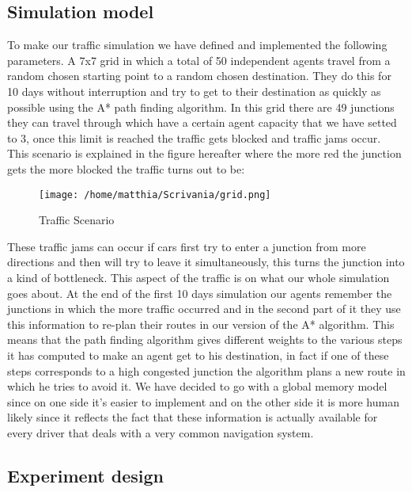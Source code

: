\documentclass[a4paper,hidelinks]{article}
\begin{document}
\subsection{Simulation model}
To make our traffic simulation we have defined and implemented the following parameters. A 7x7 grid in which a total of 50 independent agents travel from a random chosen starting point to a random chosen destination. They do this for 10 days without interruption and try to get to their destination as quickly as possible using the A* path finding algorithm. In this grid there are 49 junctions they can travel through which have a certain agent capacity that we have setted to 3, once this limit is reached the traffic gets blocked and traffic jams occur. This scenario is explained in the figure hereafter where the more red the junction gets the more blocked the traffic turns out to be:

\begin{figure}[ht!]
\centering
\texttt{[image: /home/matthia/Scrivania/grid.png]}
\caption{Traffic Scenario \label{overflow}}
\end{figure} 


These traffic jams can occur if cars first try to enter a junction from more directions and then will try to leave it simultaneously, this turns the junction into a kind of bottleneck. This aspect of the traffic is on what our whole simulation goes about. At the end of the first 10 days simulation our agents remember the junctions in which the more traffic occurred and in the second part of it they use this information to re-plan their routes in our version of the A* algorithm. This means that the path finding algorithm gives different weights to the various steps it has computed to make an agent get to his destination, in fact if one of these steps corresponds to a high congested junction the algorithm plans a new route in which he tries to avoid it. We have decided to go with a global memory model since on one side it's easier to implement and on the other side it is more human likely since it reflects the fact that these information is actually available for every driver that deals with a very common navigation system. 

\subsection{Experiment design}
\end{document}
